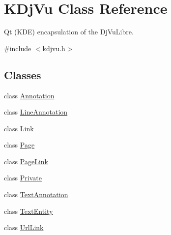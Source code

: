 \hypertarget{classKDjVu}{\section{K\+Dj\+Vu Class Reference}
\label{classKDjVu}
}


Qt (K\+D\+E) encapsulation of the Dj\+Vu\+Libre.  




{\ttfamily \#include $<$kdjvu.\+h$>$}

\subsection*{Classes}
\begin{DoxyCompactItemize}
\item 
class \hyperlink{classKDjVu_1_1Annotation}{Annotation}
\item 
class \hyperlink{classKDjVu_1_1LineAnnotation}{Line\+Annotation}
\item 
class \hyperlink{classKDjVu_1_1Link}{Link}
\item 
class \hyperlink{classKDjVu_1_1Page}{Page}
\item 
class \hyperlink{classKDjVu_1_1PageLink}{Page\+Link}
\item 
class \hyperlink{classKDjVu_1_1Private}{Private}
\item 
class \hyperlink{classKDjVu_1_1TextAnnotation}{Text\+Annotation}
\item 
class \hyperlink{classKDjVu_1_1TextEntity}{Text\+Entity}
\item 
class \hyperlink{classKDjVu_1_1UrlLink}{Url\+Link}
\end{DoxyCompactItemize}
